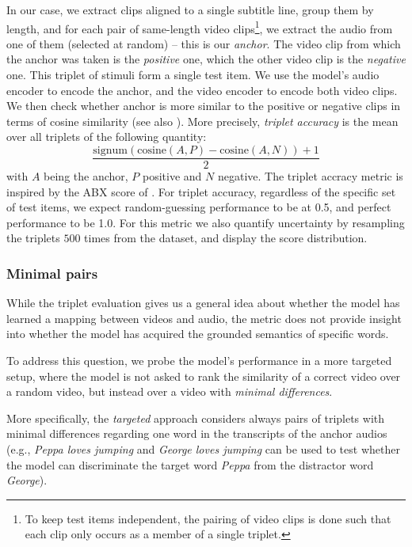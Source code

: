 In our case, we extract clips aligned to a single subtitle
line, group them by length, and for each pair of same-length video
clips\footnote{To keep test items independent, the pairing of video
  clips is done such that each clip only occurs as a member of a single
  triplet.}, we extract the audio from one of them (selected at
random) -- this is our {\it anchor}. The video clip from which the
anchor was taken is the {\it positive} one, which the other video clip
is the {\it negative} one. This triplet of stimuli form a single test
item.  We use the model's audio encoder to encode the anchor, and the
video encoder to encode both video clips. We then check whether anchor
is more similar to the positive or negative clips in terms of cosine
similarity (see also ).  More precisely, {\it triplet 
accuracy} is the mean over
all triplets of the following quantity:
\begin{equation}
  \frac{\mathrm{signum}(\mathrm{cosine}(A, P) - \mathrm{cosine}(A, N)) + 1}{2}
  \label{eq:triplet-acc}
\end{equation}
with $A$ being the anchor, $P$ positive and $N$ negative. The triplet
accracy metric is inspired by the ABX score of \citet{schatz2016abx}.
For triplet accuracy, regardless of the specific set of test items, we
expect random-guessing performance to be at 0.5, and perfect
performance to be 1.0. For this metric we also quantify uncertainty by
resampling the triplets $500$ times from the dataset, and display the
score distribution.

\subsubsection{Minimal pairs}
\label{sec:targeted}
While the triplet evaluation gives us a general idea about whether the model 
has learned a mapping between videos and audio, the metric does not provide 
insight into whether the model has acquired the grounded semantics of specific 
words.

To address this question, we probe the model's performance in a more targeted 
setup, where the model is not asked to rank the similarity of a correct video 
over a random video, but instead over a video with \textit{minimal differences}.

More specifically, the \emph{targeted} approach considers always pairs of 
triplets with minimal differences regarding one word in the transcripts of
the anchor audios (e.g., \textit{Peppa loves jumping} and
\textit{George loves jumping} can be used to test whether the model
can discriminate the target word \textit{Peppa} from the distractor
word \textit{George}).

